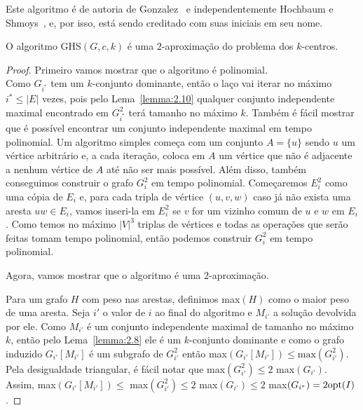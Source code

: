 Este algoritmo é de autoria de Gonzalez~\cite{GONZALEZ1985293} e independentemente Hochbaum e Shmoys~\cite{HSBottle}, e, por isso, está sendo creditado com suas iniciais em seu nome. 

\begin{theorem}
    O algoritmo {\sc GHS}$(G,c,k)$ é uma $2$-aproximação do problema dos $k$-centros.
\end{theorem}
\begin{proof}
    Primeiro vamos mostrar que o algoritmo é polinomial. \\
    Como $G_{i^*}$ tem um $k$-conjunto dominante, então o laço vai iterar no máximo $i^* \leq |E|$ vezes, pois pelo Lema~\ref{lemma:2.10} qualquer conjunto independente maximal encontrado em $G_{i^*}^2$ terá tamanho no máximo $k$.
    Também é fácil mostrar que é possível encontrar um conjunto independente maximal em tempo polinomial. Um algoritmo simples começa com um conjunto $A = \{u\}$ sendo $u$ um vértice arbitrário e, a cada iteração, coloca em $A$ um vértice que não é adjacente a nenhum vértice de $A$ até não ser mais possível.
    Além disso, também conseguimos construir o grafo $G_i^2$ em tempo polinomial. Começaremos $E_i^2$ como uma cópia de $E_i$ e, para cada tripla de vértice $(u,v,w)$ caso já não exista uma aresta $uw \in E_i$, vamos inseri-la em $E_i^2$ se $v$ for um vizinho comum de $u$ e $w$ em $E_i$. Como temos no máximo $|V|^3$ triplas de vértices e todas as operações que serão feitas tomam tempo polinomial, então podemos construir $G_i^2$ em tempo polinomial.

    Agora, vamos mostrar que o algoritmo é uma $2$-aproximação.

    Para um grafo $H$ com peso nas arestas, definimos max$(H)$ como o maior peso de uma aresta. Seja $i'$ o valor de $i$ ao final do algoritmo e $M_{i'}$ a solução devolvida por ele. Como $M_{i'}$ é um conjunto independente maximal de tamanho no máximo $k$, então pelo Lema~\ref{lemma:2.8} ele é um $k$-conjunto dominante e como o grafo induzido $G_{i'}[M_{i'}]$ é um subgrafo de $G_{i'}^2$ então max$(G_{i'}[M_{i'}]) \leq \text{max}(G_{i'}^2) $. Pela desigualdade triangular, é fácil notar que max$(G_{i'}^2) \leq 2$  max$(G_{i'})$. Assim, max$(G_{i'}[M_{i'}]) \leq $ max$(G_{i'}^2) \leq 2$ max$(G_{i'}) \leq 2$ max$(G_{i^*})= 2 \mathrm{opt}(I)$. 
\end{proof}


